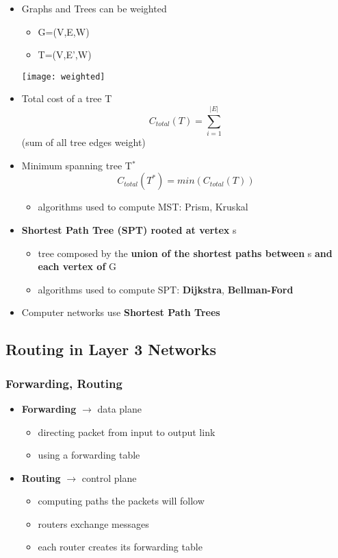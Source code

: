 \documentclass[../resumosRCOM.tex]{subfiles}
\begin{document}
\begin{itemize}
    \item Graphs and Trees can be weighted
    \begin{itemize}
        \item G=(V,E,W)
        \item T=(V,E',W)
    \end{itemize}
    \begin{center}
        \texttt{[image: weighted]}
    \end{center}
    \item Total cost of a tree T \[C_{total}(T) = \sum_{i=1}^{|E|}\] (sum of all tree edges weight)
    \item Minimum spanning tree T$^*$ \[C_{total}(T^*) = min(C_{total}(T))\]
    \begin{itemize}
        \item algorithms used to compute MST: Prism, Kruskal
    \end{itemize}
    \item \textbf{Shortest Path Tree (SPT) rooted at vertex} s
    \begin{itemize}
        \item tree composed by the \textbf{union of the shortest paths between} s \textbf{and each vertex of} G
        \item algorithms used to compute SPT: \textbf{Dijkstra}, \textbf{Bellman-Ford}
    \end{itemize}
    \item Computer networks use \textbf{Shortest Path Trees}
\end{itemize}

\subsection{Routing in Layer 3 Networks}

\subsubsection{Forwarding, Routing}

\begin{itemize}
    \item \textbf{Forwarding} $\rightarrow$ data plane
    \begin{itemize}
        \item directing packet from input to output link
        \item using a forwarding table
    \end{itemize}
    \item \textbf{Routing} $\rightarrow$ control plane
    \begin{itemize}
        \item computing paths the packets will follow
        \item routers exchange messages
        \item each router creates its forwarding table
    \end{itemize}
\end{itemize}
\end{document}
